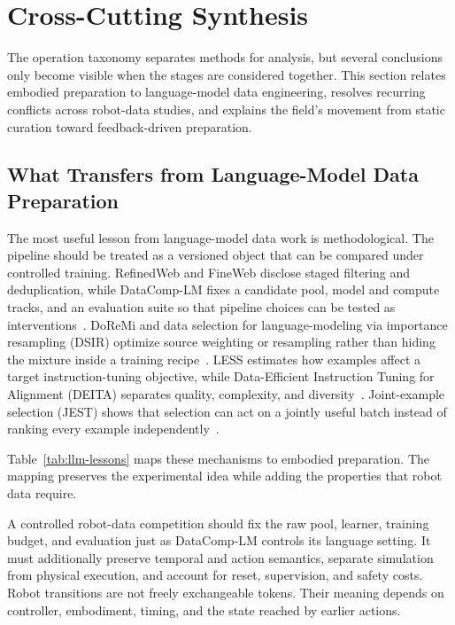 \section{Cross-Cutting Synthesis}
\label{sec:synthesis}

The operation taxonomy separates methods for analysis, but several conclusions only become visible when the stages are considered together. This section relates embodied preparation to language-model data engineering, resolves recurring conflicts across robot-data studies, and explains the field's movement from static curation toward feedback-driven preparation.

\subsection{What Transfers from Language-Model Data Preparation}

The most useful lesson from language-model data work is methodological. The pipeline should be treated as a versioned object that can be compared under controlled training. RefinedWeb and FineWeb disclose staged filtering and deduplication, while DataComp-LM fixes a candidate pool, model and compute tracks, and an evaluation suite so that pipeline choices can be tested as interventions~\cite{penedo2023refinedweb_2306_01116,penedo2024fineweb_2406_17557,li2024datacomp_2406_11794}. DoReMi and data selection for language-modeling via importance resampling (DSIR) optimize source weighting or resampling rather than hiding the mixture inside a training recipe~\cite{xie2023doremi_2305_10429,xie2023data_2302_03169}. LESS estimates how examples affect a target instruction-tuning objective, while Data-Efficient Instruction Tuning for Alignment (DEITA) separates quality, complexity, and diversity~\cite{xia2024less_2402_04333,liu2023what_2312_15685}. Joint-example selection (JEST) shows that selection can act on a jointly useful batch instead of ranking every example independently~\cite{evans2024data_2406_17711}.

Table~\ref{tab:llm-lessons} maps these mechanisms to embodied preparation. The mapping preserves the experimental idea while adding the properties that robot data require.



A controlled robot-data competition should fix the raw pool, learner, training budget, and evaluation just as DataComp-LM controls its language setting. It must additionally preserve temporal and action semantics, separate simulation from physical execution, and account for reset, supervision, and safety costs. Robot transitions are not freely exchangeable tokens. Their meaning depends on controller, embodiment, timing, and the state reached by earlier actions.

